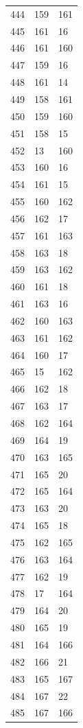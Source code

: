 \documentclass[a4paper,11pt]{article}
\begin{document}
\begin{center}
\begin{longtable}{|R{1.5cm}|R{1.5cm}|R{1.5cm}|}
  444 &  159 &  161 \\
  445 &  161 &   16 \\
  446 &  161 &  160 \\
  447 &  159 &   16 \\
  448 &  161 &   14 \\
  449 &  158 &  161 \\
  450 &  159 &  160 \\
  451 &  158 &   15 \\
  452 &   13 &  160 \\
  453 &  160 &   16 \\
  454 &  161 &   15 \\
  455 &  160 &  162 \\
  456 &  162 &   17 \\
  457 &  161 &  163 \\
  458 &  163 &   18 \\
  459 &  163 &  162 \\
  460 &  161 &   18 \\
  461 &  163 &   16 \\
  462 &  160 &  163 \\
  463 &  161 &  162 \\
  464 &  160 &   17 \\
  465 &   15 &  162 \\
  466 &  162 &   18 \\
  467 &  163 &   17 \\
  468 &  162 &  164 \\
  469 &  164 &   19 \\
  470 &  163 &  165 \\
  471 &  165 &   20 \\
  472 &  165 &  164 \\
  473 &  163 &   20 \\
  474 &  165 &   18 \\
  475 &  162 &  165 \\
  476 &  163 &  164 \\
  477 &  162 &   19 \\
  478 &   17 &  164 \\
  479 &  164 &   20 \\
  480 &  165 &   19 \\
  481 &  164 &  166 \\
  482 &  166 &   21 \\
  483 &  165 &  167 \\
  484 &  167 &   22 \\
  485 &  167 &  166 \\

\end{longtable}
\end{center}
\end{document}
